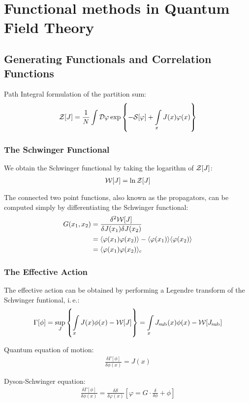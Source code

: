 \chapter{Functional methods in Quantum Field Theory}
\section{Generating Functionals and Correlation Functions}
Path Integral formulation of the partition sum:
\begin{align}
	\mathcal{Z}[J] = \frac{1}{N} \int \mathcal{D}\varphi \exp\left\{-\mathcal{S}[\varphi] + \int\limits_x J(x)\varphi(x) \right\}
\end{align}

\subsection{The Schwinger Functional}
We obtain the Schwinger functional by taking the logarithm of $\mathcal{Z}[J]$:
\begin{align}
	\mathcal{W}[J] = \operatorname{ln} \mathcal{Z}[J]
\end{align}

The connected two point functions, also known as the propagators, can be computed simply by differentiating the Schwinger functional:
\begin{align}
	G(x_1, x_2) &= \frac{\delta^2\mathcal{W}[J]}{\delta J(x_1)\delta J(x_2)} \nonumber \\
				&= \langle \varphi(x_1)\varphi(x_2) \rangle - \langle \varphi(x_1) \rangle\langle \varphi(x_2) \rangle \nonumber \\
				&= \langle \varphi(x_1)\varphi(x_2) \rangle_{\text{c}}		
\end{align}

\subsection{The Effective Action}
The effective action can be obtained by performing a Legendre transform of the Schwinger funtional, i.\,e.:
\begin{align}
\Gamma[\phi] = \underset{J}{\operatorname{sup}}\left\{ \int\limits_x J(x)\phi(x) - \mathcal{W}[J] \right\} = \int\limits_x J_{\text{sub}}(x)\phi(x) - \mathcal{W}[J_{\text{sub}}]
\end{align}

Quantum equation of motion:
\begin{align}
\frac{\delta\Gamma[\phi]}{\delta\phi(x)} = J(x)	
\end{align}

Dyson-Schwinger equation:
\begin{align}
\frac{\delta\Gamma[\phi]}{\delta\phi(x)} = \frac{\delta\mathcal{S}}{\delta\varphi(x)} \left[\varphi = G \cdot \frac{\delta}{\delta\phi} + \phi \right]
\end{align}

